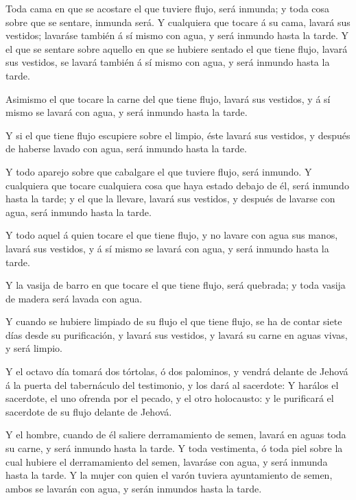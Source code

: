  Toda cama en que se acostare el que tuviere flujo, será
inmunda; y toda cosa sobre que se sentare, inmunda será.  Y
cualquiera que tocare á su cama, lavará sus vestidos; lavaráse también á
sí mismo con agua, y será inmundo hasta la tarde.  Y el que
se sentare sobre aquello en que se hubiere sentado el que tiene flujo,
lavará sus vestidos, se lavará también á sí mismo con agua, y será
inmundo hasta la tarde.

 Asimismo el que tocare la carne del que tiene flujo, lavará
sus vestidos, y á sí mismo se lavará con agua, y será inmundo hasta la
tarde.

 Y si el que tiene flujo escupiere sobre el limpio, éste
lavará sus vestidos, y después de haberse lavado con agua, será inmundo
hasta la tarde.

 Y todo aparejo sobre que cabalgare el que tuviere flujo,
será inmundo.  Y cualquiera que tocare cualquiera cosa que
haya estado debajo de él, será inmundo hasta la tarde; y el que la
llevare, lavará sus vestidos, y después de lavarse con agua, será
inmundo hasta la tarde.

 Y todo aquel á quien tocare el que tiene flujo, y no
lavare con agua sus manos, lavará sus vestidos, y á sí mismo se lavará
con agua, y será inmundo hasta la tarde.

 Y la vasija de barro en que tocare el que tiene flujo,
será quebrada; y toda vasija de madera será lavada con agua.

 Y cuando se hubiere limpiado de su flujo el que tiene
flujo, se ha de contar siete días desde su purificación, y lavará sus
vestidos, y lavará su carne en aguas vivas, y será limpio.

 Y el octavo día tomará dos tórtolas, ó dos palominos, y
vendrá delante de Jehová á la puerta del tabernáculo del testimonio, y
los dará al sacerdote:  Y harálos el sacerdote, el uno
ofrenda por el pecado, y el otro holocausto: y le purificará el
sacerdote de su flujo delante de Jehová.

 Y el hombre, cuando de él saliere derramamiento de semen,
lavará en aguas toda su carne, y será inmundo hasta la tarde.
 Y toda vestimenta, ó toda piel sobre la cual hubiere el
derramamiento del semen, lavaráse con agua, y será inmunda hasta la
tarde.  Y la mujer con quien el varón tuviera ayuntamiento
de semen, ambos se lavarán con agua, y serán inmundos hasta la tarde.

